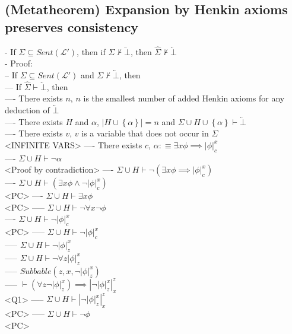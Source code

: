 \documentclass{book}
\newcommand{\is}{:\equiv}
\newcommand{\inot}{\not}
\newcommand{\contr}{\overleftarrow{\bot}}
\newcommand{\set}[1]{\left\{ #1 \right\}}
\newcommand{\sub}[3]{\left|#1\right|_{#3}^{#2}}
\begin{document}
\subsection{(Metatheorem) Expansion by Henkin axioms preserves consistency} %
	- If $\Sigma \subseteq Sent(\mathcal{L}')$, then if $\Sigma \inot \vdash \contr$, then $\hat{\Sigma} \inot \vdash \contr$ \\
	- Proof: \\
		-- If $\Sigma \subseteq Sent(\mathcal{L}')$ and $\Sigma \inot \vdash \contr$, then \\
			--- If $\hat{\Sigma} \vdash \contr$, then \\
				---- There exists $n$, $n$ is the smallest number of added Henkin axioms for any deduction of $\contr$ \\
				---- There exists $H$ and $\alpha$, $|H \cup \set{\alpha}| = n$ and $\Sigma \cup H \cup \set{\alpha} \vdash \contr$ \\
				---- There exists $v$, $v$ is a variable that does not occur in $\Sigma$ \\ <INFINITE VARS>			
				---- There exists $c$, $\alpha \is \exists x \phi \implies \sub{\phi}{x}{c}$ \\
				---- $\Sigma \cup H \vdash \lnot \alpha$ \\ <Proof by contradiction>
				---- $\Sigma \cup H \vdash \lnot (\exists x \phi \implies \sub{\phi}{x}{c})$ \\
				---- $\Sigma \cup H \vdash (\exists x \phi \land \lnot \sub{\phi}{x}{c})$ \\ <PC>
				---- $\Sigma \cup H \vdash \exists x \phi$ \\ <PC>
					----- $\Sigma \cup H \vdash \lnot \forall x \lnot \phi$ \\
				---- $\Sigma \cup H \vdash \lnot \sub{\phi}{x}{c}$ \\ <PC>
					----- $\Sigma \cup H \vdash \lnot \sub{\phi}{x}{c}$ \\
					----- $\Sigma \cup H \vdash \lnot \sub{\phi}{x}{z}$ \\
					----- $\Sigma \cup H \vdash \lnot \forall z \sub{\phi}{x}{z}$ \\
					----- $Subbable(z, x, \lnot \sub{\phi}{x}{z})$ \\
					----- $\vdash (\forall z \lnot \sub{\phi}{x}{z}) \implies \sub{\lnot \sub{\phi}{x}{z}}{z}{x}$ \\ <Q1>
					----- $\Sigma \cup H \vdash \sub{\lnot \sub{\phi}{x}{z}}{z}{x}$ \\ <PC>
					----- $\Sigma \cup H \vdash \lnot \phi$ \\ <PC>
\end{document}
